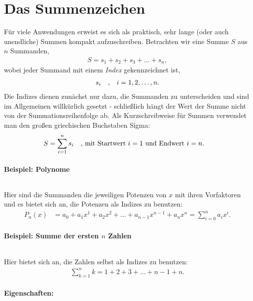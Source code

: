 \section{Das Summenzeichen}

Für viele Anwendungen erweist es sich als praktisch, sehr lange (oder auch unendliche) Summen kompakt aufzuschreiben. Betrachten wir eine Summe $S$ aus $n$ Summanden, 
\begin{align}
    S = s_1 + s_2 + s_3 + \hdots + s_n,
\end{align}
wobei jeder Summand mit einem \emph{Index} gekennzeichnet ist, 
\begin{align}
    s_i \qq{,} i=1,2,\hdots,n.
\end{align}
Die Indizes dienen zunächst nur dazu, die Summanden zu unterscheiden und sind im Allgemeinen willkürlich gesetzt - schließlich hängt der Wert der Summe nicht von der Summationsreihenfolge ab. Als Kurzschreibweise für Summen verwendet man den großen griechischen Buchstaben Sigma:
\begin{align}
    S = \sum_{i=1}^n s_i \qq{, mit Startwert $i=1$ und Endwert $i=n$.} 
\end{align}

\paragraph{Beispiel: Polynome}$~$

Hier sind die Summanden die jeweiligen Potenzen von $x$ mit ihren Vorfaktoren und es bietet sich an, die Potenzen als Indizes zu benutzen: 
\begin{align}
    P_n(x) &= a_0 + a_1 x^1 + a_2 x^2 + \hdots + a_{n-1} x^{n-1} + a_n x^n  = \sum_{i=0}^n a_i x^i.
\end{align}

\paragraph{Beispiel: Summe der ersten $n$ Zahlen}$~$

Hier bietet sich an, die Zahlen selbst als Indizes zu benutzen: 
\begin{align}
    \sum_{k=1}^n k = 1 + 2 + 3 + \hdots + n-1 +n.
\end{align}

\paragraph{Eigenschaften:}$~$

